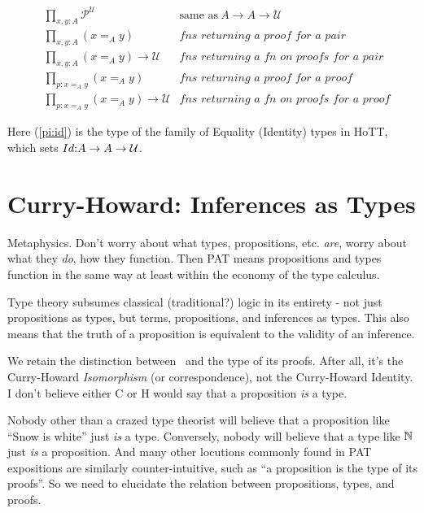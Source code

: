 \documentclass{article}
\begin{document}
\begin{align}
  &\prod\limits_{x,y:A}\mathcal{P}^{\mathcal{U}} & \textrm{same as}\ A\to A\to\mathcal{U} \label{pi:id} \\
  &\prod\limits_{x,y:A}(x=_Ay) &\textit{fns returning a proof for a pair} \label{pi:idp} \\
  &\prod\limits_{x,y:A}(x=_Ay)\to\mathcal{U} & \textit{fns returning a fn on proofs for a pair} \label{pi:idppfam} \\
  &\prod\limits_{p{:}x=_Ay}(x=_Ay) \label{pi:idpp} & \textit{fns returning a proof for a proof} \\
  &\prod\limits_{p{:}x=_Ay}(x=_Ay)\to\mathcal{U} & \textit{fns returning a fn on proofs for a proof} \label{pi:idfam}
\end{align}

Here (\ref{pi:id}) is the type of the family of Equality (Identity)
types in HoTT, which sets \(Id{:}A\to A\to\mathcal{U}\).



\section{Curry-Howard: Inferences as Types}

\begin{remark}
Metaphysics.  Don't worry about what types, propositions,
etc. \emph{are}, worry about what they \emph{do}, how they function.
Then PAT means propositions and types function in the same way at
least within the economy of the type calculus.
\end{remark}

Type theory subsumes classical (traditional?) logic in its entirety -
not just propositions as types, but terms, propositions, and
inferences as types.  This also means that the truth of a proposition
is equivalent to the validity of an inference.

We retain the distinction between \PropP\ and the type of its proofs.
After all, it's the Curry-Howard \emph{Isomorphism} (or
correspondence), not the Curry-Howard Identity.  I don't believe
either C or H would say that a proposition \emph{is} a type.

Nobody other than a crazed type theorist will believe that a
proposition like ``Snow is white'' just \emph{is} a type.  Conversely,
nobody will believe that a type like \(\mathbb{N}\) just \emph{is} a
proposition.  And many other locutions commonly found in PAT
expositions are similarly counter-intuitive, such as ``a proposition
is the type of its proofs''.  So we need to elucidate the relation
between propositions, types, and proofs.
\end{document}
